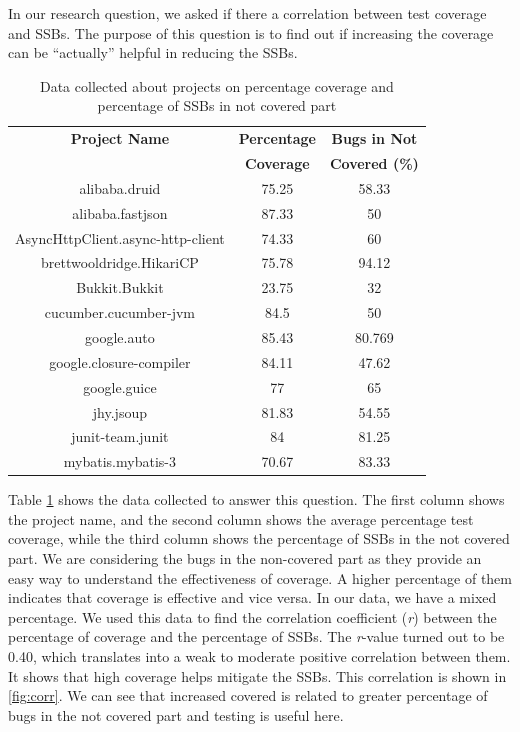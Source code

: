 \documentclass[sigconf,nonacm]{acmart}
\begin{document}
In our research question, we asked if there a correlation between test coverage and SSBs. The purpose of this question is to find out if increasing the coverage can be “actually” helpful in reducing the SSBs.
\begin{table}[h]
	\begin{tabular}{|c|c|c|}
		\hline
		\textbf{Project Name} & \textbf{Percentage} & \textbf{Bugs in Not} \\
		&\textbf{Coverage}& \textbf{Covered (\%)}\\
		\hline
		alibaba.druid &75.25&58.33\\
		alibaba.fastjson & 87.33&	50\\
		AsyncHttpClient.async-http-client &74.33&60\\
		brettwooldridge.HikariCP &75.78&	94.12\\
		Bukkit.Bukkit &23.75&32\\
		cucumber.cucumber-jvm &84.5&50\\
		google.auto &85.43&80.769\\
		google.closure-compiler &84.11&	47.62\\
		google.guice&77&65\\
		jhy.jsoup&81.83&54.55\\
		junit-team.junit &84&81.25\\
		mybatis.mybatis-3 &70.67&83.33\\
		\hline
	\end{tabular}
	\caption{Data collected about projects on percentage coverage and percentage of SSBs in not covered part}
	\label{tab:ppc}
\end{table}
Table \ref{tab:ppc}  shows the data collected to answer this question. The first column shows the project name, and the second column shows the average percentage test coverage, while the third column shows the percentage of SSBs in the not covered part. We are considering the bugs in the non-covered part as they provide an easy way to understand the effectiveness of coverage. A higher percentage of them indicates that coverage is effective and vice versa. In our data, we have a mixed percentage. We used this data to find the correlation coefficient (\emph{r}) between the percentage of coverage and the percentage of SSBs. The \emph{r}-value turned out to be 0.40, which translates into a weak to moderate positive correlation between them. It shows that high coverage helps mitigate the SSBs. This correlation is shown in \ref{fig:corr}. We can see that increased covered is related to greater percentage of bugs in the not covered part and testing is useful here.\\
\end{document}
